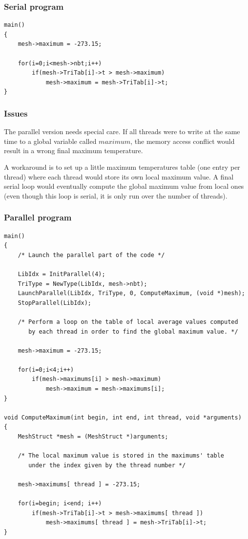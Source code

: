 \documentclass[a4paper,12pt]{article}
\begin{document}
\subsubsection{Serial program}

\begin{tt}
\begin{verbatim}
main()
{
    mesh->maximum = -273.15;

    for(i=0;i<mesh->nbt;i++)
        if(mesh->TriTab[i]->t > mesh->maximum)
            mesh->maximum = mesh->TriTab[i]->t;
}
\end{verbatim}
\end{tt}
\normalfont

\subsubsection{Issues}

The parallel version needs special care. If all threads were to write at the same time to a global variable called $maximum$, the memory access conflict would result in a wrong final maximum temperature.

A workaround is to set up a little maximum temperatures table (one entry per thread) where each thread would store its own local maximum value. A final serial loop would eventually compute the global maximum value from local ones (even though this loop is serial, it is only run over the number of threads).

\subsubsection{Parallel program}

\begin{tt}
\begin{verbatim}
main()
{
    /* Launch the parallel part of the code */

    LibIdx = InitParallel(4);
    TriType = NewType(LibIdx, mesh->nbt);
    LaunchParallel(LibIdx, TriType, 0, ComputeMaximum, (void *)mesh);
    StopParallel(LibIdx);

    /* Perform a loop on the table of local average values computed
       by each thread in order to find the global maximum value. */

    mesh->maximum = -273.15;

    for(i=0;i<4;i++)
        if(mesh->maximums[i] > mesh->maximum)
            mesh->maximum = mesh->maximums[i];
}

void ComputeMaximum(int begin, int end, int thread, void *arguments)
{
    MeshStruct *mesh = (MeshStruct *)arguments;

    /* The local maximum value is stored in the maximums' table
       under the index given by the thread number */

    mesh->maximums[ thread ] = -273.15;

    for(i=begin; i<end; i++)
        if(mesh->TriTab[i]->t > mesh->maximums[ thread ])
            mesh->maximums[ thread ] = mesh->TriTab[i]->t;
}
\end{verbatim}
\end{tt}
\normalfont
\end{document}
